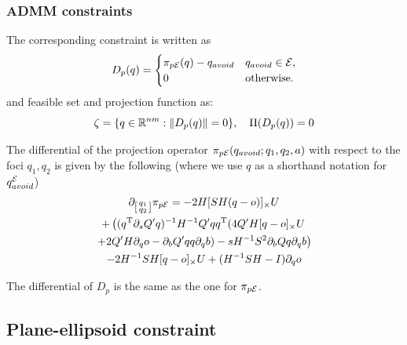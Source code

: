 \documentclass[journal]{IEEEtran}  %
\begin{document}
  \subsubsection{ADMM constraints}
  The corresponding constraint is written as
  \begin{equation}
    D_{p}(q) = \begin{cases}
      \pi_{p\mathcal{E}}(q) - q_{avoid} & q_{avoid} \in \mathcal{E}, \\
      {0} & \textrm{otherwise}.
    \end{cases}
  \end{equation}
  and feasible set and projection function as:
  \begin{equation}
    \zeta = \{q\in\mathbb{R}^{nm}:\lVert D_p(q)\rVert = 0 \},\quad \Pi(D_p(q)) = {0}
  \end{equation}

  \begin{proposition}\label{prop:Ellipse2PointDiff}
    The differential of the projection operator $\pi_{p\mathcal{E}}(q_{avoid}; q_1,q_2,a)$ with respect to the foci $q_1,q_2$ is given by the following (where we use $q$ as a shorthand notation for $q^{\mathcal{E}}_{avoid}$)
    \begin{multline}
      \partial_{\left[\begin{smallmatrix}q_1\\q_2\end{smallmatrix}\right]} \pi_{p\mathcal{E}}=-2 H [ SH(q-o)]_{\times}U   \\
      + \left( (q^\mathrm{T} \partial_sQ' q)^{-1} H^{-1} Q' q q^\mathrm{T}  (4Q' H[q - o]_\times U \right. \\
      \left.+ 2Q' H\partial_q o - \partial_b Q' q q \partial_q b) -  s H^{-1} S^2 \partial_b Q q \partial_q b\right) \\
      -2H^{-1} S H[q-o]_{\times} U  + (H^{-1}SH -I)\partial_q o
    \end{multline}
  \end{proposition}
  The differential of $D_p$ is the same as the one for $\pi_{p\mathcal{E}}$.

\subsection{Plane-ellipsoid constraint}\label{sec:ellipsoide-plane}
\end{document}
